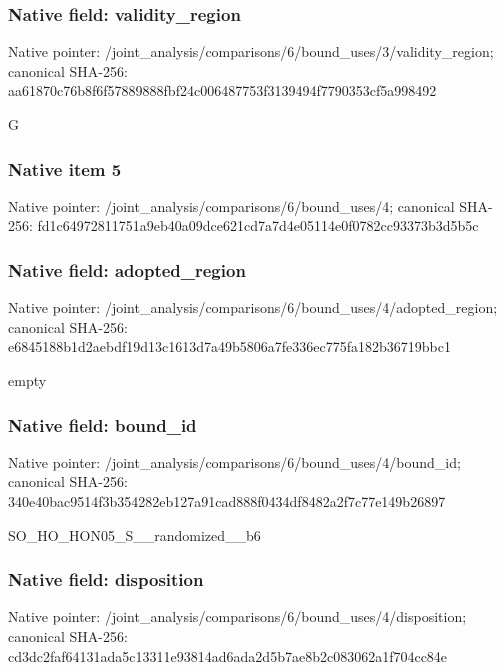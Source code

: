 \documentclass[10pt,a4paper]{article}
\begin{document}
\subsubsection{Native field: validity\_\allowbreak{}region}
Native pointer: /joint\_\allowbreak{}analysis/comparisons/6/bound\_\allowbreak{}uses/3/validity\_\allowbreak{}region; canonical SHA-256: aa61870c76b8f6f57889888fbf24c006487753f3139494f7790353cf5a998492

\begingroup\raggedright\sloppy G\par\endgroup

\subsubsection{Native item 5}
Native pointer: /joint\_\allowbreak{}analysis/comparisons/6/bound\_\allowbreak{}uses/4; canonical SHA-256: fd1c64972811751a9eb40a09dce621cd7a7d4e05114e0f0782cc93373b3d5b5c

\subsubsection{Native field: adopted\_\allowbreak{}region}
Native pointer: /joint\_\allowbreak{}analysis/comparisons/6/bound\_\allowbreak{}uses/4/adopted\_\allowbreak{}region; canonical SHA-256: e6845188b1d2aebdf19d13c1613d7a49b5806a7fe336ec775fa182b36719bbc1

\begingroup\raggedright\sloppy empty\par\endgroup

\subsubsection{Native field: bound\_\allowbreak{}id}
Native pointer: /joint\_\allowbreak{}analysis/comparisons/6/bound\_\allowbreak{}uses/4/bound\_\allowbreak{}id; canonical SHA-256: 340e40bac9514f3b354282eb127a91cad888f0434df8482a2f7c77e149b26897

\begingroup\raggedright\sloppy SO\_\allowbreak{}HO\_\allowbreak{}HON05\_\allowbreak{}S\_\allowbreak{}\_\allowbreak{}randomized\_\allowbreak{}\_\allowbreak{}b6\par\endgroup

\subsubsection{Native field: disposition}
Native pointer: /joint\_\allowbreak{}analysis/comparisons/6/bound\_\allowbreak{}uses/4/disposition; canonical SHA-256: cd3dc2faf64131ada5c13311e93814ad6ada2d5b7ae8b2c083062a1f704cc84e
\end{document}
